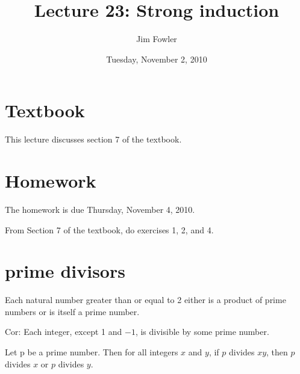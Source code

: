 \documentclass[12pt]{handout}
\title{Lecture 23: Strong induction}
\author{Jim Fowler}
\date{Tuesday, November  2, 2010}
\begin{document}
\maketitle

\section*{Textbook}

This lecture discusses section 7 of the textbook.

\section*{Homework} 

The homework is due Thursday, November  4, 2010.

From Section 7 of the textbook, do exercises 1, 2, and 4.

\section*{prime divisors}

Each natural number greater than or equal to 2 either is a product of
prime numbers or is itself a prime number.

Cor: Each integer, except 1 and $−1$, is divisible by some prime number.

Let p be a prime number. Then for all integers $x$ and $y$, if $p$ divides $xy$, then $p$ divides $x$ or $p$ divides $y$.
\end{document}
